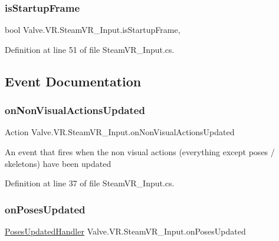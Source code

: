\subsubsection{\texorpdfstring{isStartupFrame}{isStartupFrame}}
{\footnotesize\ttfamily bool Valve.\+V\+R.\+Steam\+V\+R\+\_\+\+Input.\+is\+Startup\+Frame\hspace{0.3cm}{\ttfamily [static]}, {\ttfamily [get]}}



Definition at line 51 of file Steam\+V\+R\+\_\+\+Input.\+cs.



\subsection{Event Documentation}
\mbox{\label{class_valve_1_1_v_r_1_1_steam_v_r___input_a41fa3f6c1ba5a5464ce99167780db227}} 
\subsubsection{\texorpdfstring{onNonVisualActionsUpdated}{onNonVisualActionsUpdated}}
{\footnotesize\ttfamily Action Valve.\+V\+R.\+Steam\+V\+R\+\_\+\+Input.\+on\+Non\+Visual\+Actions\+Updated\hspace{0.3cm}{\ttfamily [static]}}



An event that fires when the non visual actions (everything except poses / skeletons) have been updated 



Definition at line 37 of file Steam\+V\+R\+\_\+\+Input.\+cs.

\mbox{\label{class_valve_1_1_v_r_1_1_steam_v_r___input_a930229f4a6d398c4c911f45063592e28}} 
\subsubsection{\texorpdfstring{onPosesUpdated}{onPosesUpdated}}
{\footnotesize\ttfamily \mbox{\hyperlink{class_valve_1_1_v_r_1_1_steam_v_r___input_acfd43d7f2d9763ec0aff8e11dfdcf15d}{Poses\+Updated\+Handler}} Valve.\+V\+R.\+Steam\+V\+R\+\_\+\+Input.\+on\+Poses\+Updated\hspace{0.3cm}{\ttfamily [static]}}



